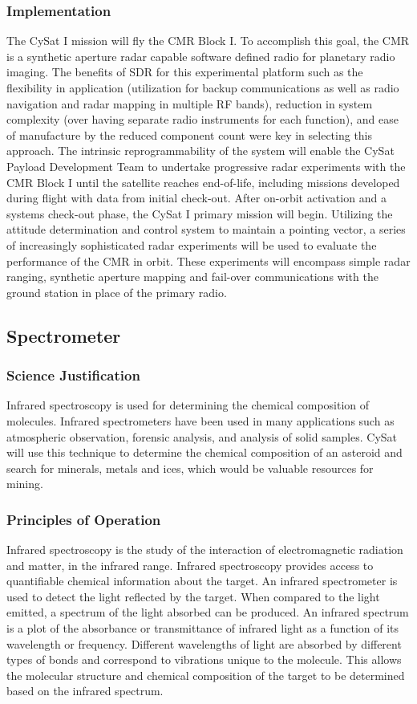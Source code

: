 \documentclass[nocover]            %
{CSLI}                       %
\begin{document}
\subsubsection{Implementation}
The CySat I mission will fly the CMR Block I. To accomplish this goal, the CMR is a synthetic aperture radar capable software defined radio for planetary radio imaging. The benefits of SDR for this experimental platform such as the flexibility in application (utilization for backup communications as well as radio navigation and radar mapping in multiple RF bands), reduction in system complexity (over having separate radio instruments for each function), and ease of manufacture by the reduced component count were key in selecting this approach. The intrinsic reprogrammability of the system will enable the CySat Payload Development Team to undertake progressive radar experiments with the CMR Block I until the satellite reaches end-of-life, including missions developed during flight with data from initial check-out.\newline
\indent After on-orbit activation and a systems check-out phase, the CySat I primary mission will begin. Utilizing the attitude determination and control system to maintain a pointing vector, a series of increasingly sophisticated radar experiments will be used to evaluate the performance of the CMR in orbit. These experiments will encompass simple radar ranging, synthetic aperture mapping and fail-over communications with the ground station in place of the primary radio.\\
\subsection{Spectrometer}
\subsubsection{Science Justification}
Infrared spectroscopy is used for determining the chemical composition of molecules. Infrared spectrometers have been used in many applications such as atmospheric observation, forensic analysis, and analysis of solid samples. CySat will use this technique to determine the chemical composition of an asteroid and search for minerals, metals and ices, which would be valuable resources for mining.
\subsubsection{Principles of Operation}
Infrared spectroscopy is the study of the interaction of electromagnetic radiation and matter, in the infrared range. Infrared spectroscopy provides access to quantifiable chemical information about the target. An infrared spectrometer is used to detect the light reflected by the target. When compared to the light emitted, a spectrum of the light absorbed can be produced. An infrared spectrum is a plot of the absorbance or transmittance of infrared light as a function of its wavelength or frequency. Different wavelengths of light are absorbed by different types of bonds and correspond to vibrations unique to the molecule. This allows the molecular structure and chemical composition of the target to be determined based on the infrared spectrum.
\end{document}
